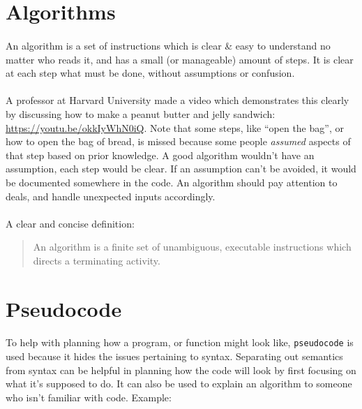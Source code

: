 \documentclass[letter,10pt]{article}
\begin{document}
\section{Algorithms}
\paragraph{}An algorithm is a set of instructions which is clear \& easy to understand no matter who reads it, and has a small (or manageable) amount of steps. It is clear at each step what must be done, without assumptions or confusion.

\paragraph{}A professor at Harvard University made a video which demonstrates this clearly by discussing how to make a peanut butter and jelly sandwich: \url{https://youtu.be/okkIyWhN0iQ}. Note that some steps, like ``open the bag'', or how to open the bag of bread, is missed because some people \textit{assumed} aspects of that step based on prior knowledge. A good algorithm wouldn't have an assumption, each step would be clear. If an assumption can't be avoided, it would be documented somewhere in the code. An algorithm should pay attention to deals, and handle unexpected inputs accordingly.

\paragraph{}A clear and concise definition:
\begin{quote}
An algorithm is a finite set of unambiguous, executable instructions which directs a terminating activity.
\end{quote}

\section{Pseudocode}
\paragraph{}To help with planning how a program, or function might look like, \texttt{pseudocode} is used because it hides the issues pertaining to syntax. Separating out semantics from syntax can be helpful in planning how the code will look by first focusing on what it's supposed to do. It can also be used to explain an algorithm to someone who isn't familiar with code. Example:
\end{document}

